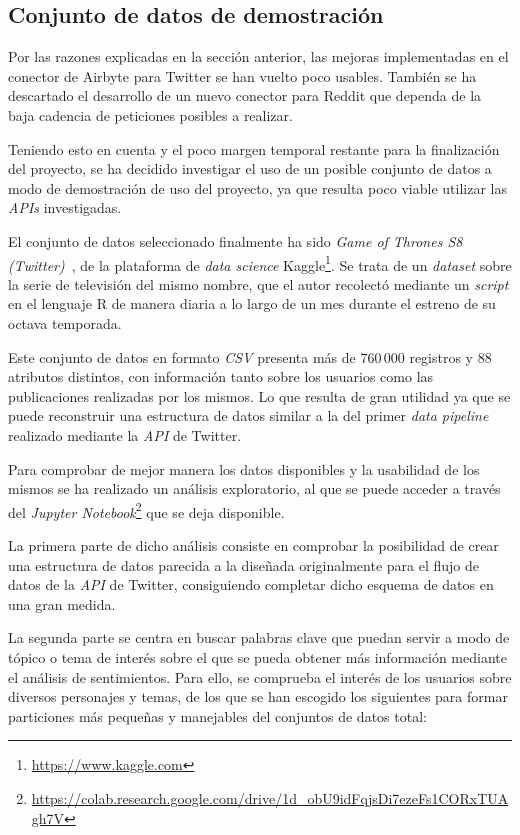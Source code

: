 \subsection{Conjunto de datos de demostración}

Por las razones explicadas en la sección anterior, las mejoras implementadas en el conector de Airbyte para Twitter se han vuelto poco usables. También se ha descartado el desarrollo de un nuevo conector para Reddit que dependa de la baja cadencia de peticiones posibles a realizar.

Teniendo esto en cuenta y el poco margen temporal restante para la finalización del proyecto, se ha decidido investigar el uso de un posible conjunto de datos a modo de demostración de uso del proyecto, ya que resulta poco viable utilizar las \textit{APIs} investigadas.

El conjunto de datos seleccionado finalmente ha sido \textit{Game of Thrones S8 (Twitter)}~\cite{got8}, de la plataforma de \textit{data science} Kaggle\footnote{\url{https://www.kaggle.com}}. Se trata de un \textit{dataset} sobre la serie de televisión del mismo nombre, que el autor recolectó mediante un \textit{script} en el lenguaje R de manera diaria a lo largo de un mes durante el estreno de su octava temporada.

Este conjunto de datos en formato \textit{CSV} presenta más de 760\,000 registros y 88 atributos distintos, con información tanto sobre los usuarios como las publicaciones realizadas por los mismos. Lo que resulta de gran utilidad ya que se puede reconstruir una estructura de datos similar a la del primer \textit{data pipeline} realizado mediante la \textit{API} de Twitter.

Para comprobar de mejor manera los datos disponibles y la usabilidad de los mismos se ha realizado un análisis exploratorio, al que se puede acceder a través del \textit{Jupyter Notebook}\footnote{\url{https://colab.research.google.com/drive/1d_obU9idFqjsDi7ezeFs1CORxTUAgh7V}} que se deja disponible.

La primera parte de dicho análisis consiste en comprobar la posibilidad de crear una estructura de datos parecida a la diseñada originalmente para el flujo de datos de la \textit{API} de Twitter, consiguiendo completar dicho esquema de datos en una gran medida.

La segunda parte se centra en buscar palabras clave que puedan servir a modo de tópico o tema de interés sobre el que se pueda obtener más información mediante el análisis de sentimientos. Para ello, se comprueba el interés de los usuarios sobre diversos personajes y temas, de los que se han escogido los siguientes para formar particiones más pequeñas y manejables del conjuntos de datos total:

